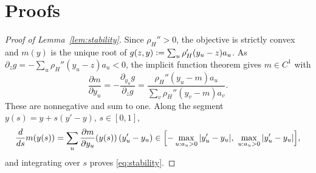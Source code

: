 \documentclass[11pt]{article}
\newcommand{\eqdef}{\mathrel{\vcentcolon=}}
\theoremstyle{definition}
\begin{document}
\appendix
\section{Proofs}\label{sec:proofs}

\begin{proof}[Proof of Lemma~\ref{lem:stability}]
Since \(\rho_H''>0\), the objective is strictly convex and \(m(y)\) is the
unique root of \(g(z,y)\eqdef\sum_u\rho_H'(y_u-z)a_u\).  As
\(\partial_zg=-\sum_u\rho_H''(y_u-z)a_u<0\), the implicit function theorem
gives \(m\in C^1\) with
\[
  \frac{\partial m}{\partial y_u}
  =-\frac{\partial_{y_u}g}{\partial_zg}
  =\frac{\rho_H''(y_u-m)a_u}{\sum_v\rho_H''(y_v-m)a_v}.
\]
These are nonnegative and sum to one.  Along the segment
\(y(s)=y+s(y'-y)\), \(s\in[0,1]\),
\[
  \frac{d}{ds}m(y(s))
  =\sum_u\frac{\partial m}{\partial y_u}(y(s))\,(y'_u-y_u)
  \in\Bigl[-\max_{u:a_u>0}|y'_u-y_u|,\ \max_{u:a_u>0}|y'_u-y_u|\Bigr],
\]
and integrating over \(s\) proves \eqref{eq:stability}.
\end{proof}
\end{document}
